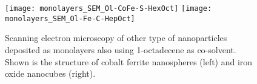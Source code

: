 \documentclass[\main/dresen_thesis.tex]{subfiles}
\begin{document}
  \label{sec:monolayers:preparation:nanoparticleVariation}
    \begin{figure}[tb]
      \centering
      \texttt{[image: monolayers\_SEM\_Ol-CoFe-S-HexOct]}
      \texttt{[image: monolayers\_SEM\_Ol-Fe-C-HepOct]}
      \caption{\label{fig:monolayers:preparation:nanoparticleVariation:spheresIron}Scanning electron microscopy of other type of nanoparticles deposited as monolayers also using 1-octadecene as co-solvent. Shown is the structure of cobalt ferrite nanospheres (left) and iron oxide nanocubes (right).}
    \end{figure}
\end{document}
